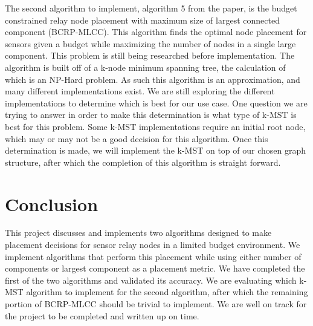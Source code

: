 \documentclass{article}
\begin{document}
The second algorithm to implement, algorithm 5 from the paper, is the budget constrained relay node placement with maximum size of largest connected component (BCRP-MLCC).
This algorithm finds the optimal node placement for sensors given a budget while maximizing the number of nodes in a single large component.
This problem is still being researched before implementation.
The algorithm is built off of a k-node minimum spanning tree, the calculation of which is an NP-Hard problem.
As such this algorithm is an approximation, and many different implementations exist.
We are still exploring the different implementations to determine which is best for our use case.
One question we are trying to answer in order to make this determination is what type of k-MST is best for this problem.
Some k-MST implementations require an initial root node, which may or may not be a good decision for this algorithm.
Once this determination is made, we will implement the k-MST on top of our chosen graph structure, after which the completion of this algorithm is straight forward.

\section{Conclusion}

This project discusses and implements two algorithms designed to make placement decisions for sensor relay nodes in a limited budget environment.
We implement algorithms that perform this placement while using either number of components or largest component as a placement metric.
We have completed the first of the two algorithms and validated its accuracy.
We are evaluating which k-MST algorithm to implement for the second algorithm, after which the remaining portion of BCRP-MLCC should be trivial to implement.
We are well on track for the project to be completed and written up on time.






\end{document}

